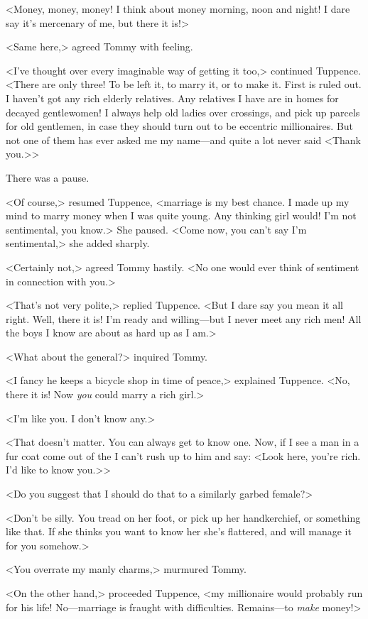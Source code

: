 <Money, money, money! I think about money morning, noon and night! I dare say it's mercenary of me, but there it is!>

<Same here,> agreed Tommy with feeling.

<I've thought over every imaginable way of getting it too,> continued Tuppence. <There are only three! To be left it, to marry it, or to make it. First is ruled out. I haven't got any rich elderly relatives. Any relatives I have are in homes for decayed gentlewomen! I always help old ladies over crossings, and pick up parcels for old gentlemen, in case they should turn out to be eccentric millionaires. But not one of them has ever asked me my name—and quite a lot never said <Thank you.>>

There was a pause.

<Of course,> resumed Tuppence, <marriage is my best chance. I made up my mind to marry money when I was quite young. Any thinking girl would! I'm not sentimental, you know.> She paused. <Come now, you can't say I'm sentimental,> she added sharply.

<Certainly not,> agreed Tommy hastily. <No one would ever think of sentiment in connection with you.>

<That's not very polite,> replied Tuppence. <But I dare say you mean it all right. Well, there it is! I'm ready and willing—but I never meet any rich men! All the boys I know are about as hard up as I am.>

<What about the general?> inquired Tommy.

<I fancy he keeps a bicycle shop in time of peace,> explained Tuppence. <No, there it is! Now \emph{you} could marry a rich girl.>

<I'm like you. I don't know any.>

<That doesn't matter. You can always get to know one. Now, if I see a man in a fur coat come out of the  I can't rush up to him and say: <Look here, you're rich. I'd like to know you.>>

<Do you suggest that I should do that to a similarly garbed female?>

<Don't be silly. You tread on her foot, or pick up her handkerchief, or something like that. If she thinks you want to know her she's flattered, and will manage it for you somehow.>

<You overrate my manly charms,> murmured Tommy.

<On the other hand,> proceeded Tuppence, <my millionaire would probably run for his life! No—marriage is fraught with difficulties. Remains—to \emph{make} money!>

